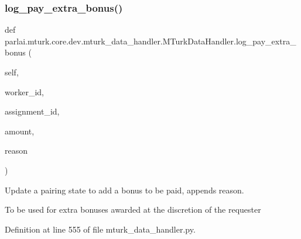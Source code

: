 \subsubsection{\texorpdfstring{log\+\_\+pay\+\_\+extra\+\_\+bonus()}{log\_pay\_extra\_bonus()}}
{\footnotesize\ttfamily def parlai.\+mturk.\+core.\+dev.\+mturk\+\_\+data\+\_\+handler.\+M\+Turk\+Data\+Handler.\+log\+\_\+pay\+\_\+extra\+\_\+bonus (\begin{DoxyParamCaption}\item[{}]{self,  }\item[{}]{worker\+\_\+id,  }\item[{}]{assignment\+\_\+id,  }\item[{}]{amount,  }\item[{}]{reason }\end{DoxyParamCaption})}

\begin{DoxyVerb}Update a pairing state to add a bonus to be paid, appends reason.

To be used for extra bonuses awarded at the discretion of the requester
\end{DoxyVerb}
 

Definition at line 555 of file mturk\+\_\+data\+\_\+handler.\+py.


